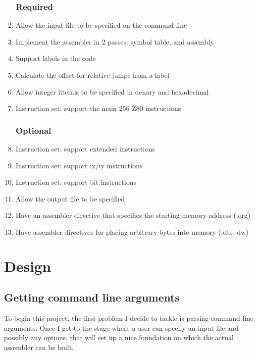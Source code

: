 \documentclass[a4paper]{report}
\begin{document}
\begin{enumerate}

\subsection{Required}

	\item \label{req_inputFile}
		Allow the input file to be specified on the command line
	\item \label{req_doAsm}
		Implement the assembler in 2 passes: symbol table, and assembly
	\item \label{req_doLabels}
		Support labels in the code
	\item
		Calculate the offset for relative jumps from a label
	\item
		Allow integer literals to be specified in denary and hexadecimal
	\item
		Instruction set: support the main 256 Z80 instructions

\subsection{Optional}

	\item Instruction set: support extended instructions
	\item Instruction set: support ix/iy instructions
	\item Instruction set: support bit instructions
	\item Allow the output file to be specified
	\item Have an assembler directive that specifies the starting memory address
		(.org)
	\item Have assembler directives for placing arbitrary bytes into memory
		(.db, .dw)

\end{enumerate}



\chapter{Design}

\section{Getting command line arguments}

To begin this project, the first problem I decide to tackle is parsing command
line arguments. Once I get to the stage where a user can specify an input file
and possibly any options, that will set up a nice foundation on which the actual
assembler can be built.
\end{document}
